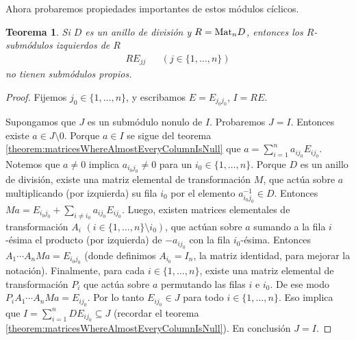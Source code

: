 \documentclass{report}
\newcommand{\Mat}{\textnormal{Mat}}
\newtheorem{theorem}{Teorema}
\begin{document}
  Ahora probaremos propiedades importantes de estos módulos cíclicos.

  \begin{theorem}
    Si \(D\) es un anillo de división y \(R = \Mat_n D\),
    entonces los \(R\)-submódulos izquierdos de \(R\)
    \begin{align}
      R E_{j j}
      &&(j \in \{1, \dots, n\})
    \end{align}
    no tienen submódulos propios.
  \end{theorem}
  \begin{proof}
    Fijemos \(j_0 \in \{1, \dots, n\}\), y escribamos \(E = E_{j_0 j_0}\), \(I = R E\).

    Supongamos que \(J\) es un submódulo nonulo de \(I\).
    Probaremos \(J = I\).
    Entonces existe \(a \in J \setminus 0\).
    Porque \(a \in I\) se sigue del teorema \ref{theorem:matricesWhereAlmostEveryColumnIsNull} que \(a = \sum_{i = 1}^n a_{i j_0} E_{i j_0}\).
    Notemos que \(a \neq 0\) implica \(a_{i_0 j_0} \neq 0\) para un \(i_0 \in \{1, \dots, n\}\).
    Porque \(D\) es un anillo de división, existe una matriz elemental de transformación \(M\), que actúa sobre \(a\) multiplicando (por izquierda) su fila \(i_0\) por el elemento \(a_{i_0 j_0}^{- 1} \in D\).
    Entonces \(M a = E_{i_0 j_0} + \sum_{i \neq i_0} a_{i j_0} E_{i j_0}\).
    Luego, existen matrices elementales de transformación \(A_i\) \((i \in \{1, \dots, n\} \setminus i_0)\), que actúan sobre \(a\) sumando a la fila \(i\)-ésima el producto (por izquierda) de \(- a_{i j_0}\) con la fila \(i_0\)-ésima.
    Entonces \(A_1 \cdots A_n M a = E_{i_0 j_0}\) (donde definimos \(A_{i_0} = I_n\), la matriz identidad, para mejorar la notación).
    Finalmente, para cada \(i \in \{1, \dots, n\}\), existe una matriz elemental de transformación \(P_i\) que actúa sobre \(a\) permutando las filas \(i\) e \(i_0\).
    De ese modo \(P_i A_1 \cdots A_n M a = E_{i j_0}\).
    Por lo tanto \(E_{i j_0} \in J\) para todo \(i \in \{1, \dots, n\}\).
    Eso implica que \(I = \sum_{i = 1}^n D E_{i j_0} \subseteq J\) (recordar el teorema \ref{theorem:matricesWhereAlmostEveryColumnIsNull}).
    En conclusión \(J = I\).
  \end{proof}
\end{document}
